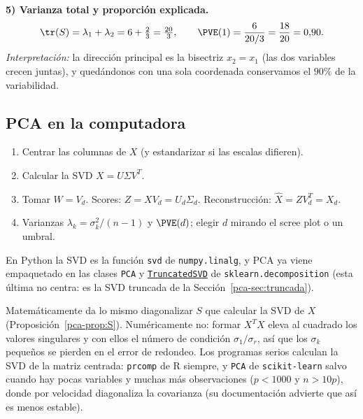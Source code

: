 \begin{example}
\medskip
\noindent\textbf{5) Varianza total y proporción explicada.}
\[
\tr(S)=\lambda_1+\lambda_2=6+\tfrac23=\tfrac{20}{3},\qquad
\PVE(1)=\frac{6}{20/3}=\frac{18}{20}=0{,}90 .
\]
\textit{Interpretación:} la dirección principal es la bisectriz $x_2=x_1$ (las
dos variables crecen juntas), y quedándonos con una sola coordenada
conservamos el $90\%$ de la variabilidad.
\end{example}

\subsection{PCA en la computadora}

\begin{enumerate}[leftmargin=*,itemsep=1pt]
\item Centrar las columnas de $X$ (y estandarizar si las escalas difieren).
\item Calcular la SVD $X=U\Sigma V^T$.
\item Tomar $W=V_d$. Scores: $Z=XV_d=U_d\Sigma_d$. Reconstrucción:
$\widehat X=ZV_d^T=X_d$.
\item Varianzas $\lambda_k=\sigma_k^2/(n-1)$ y $\PVE(d)$; elegir $d$ mirando el
scree plot o un umbral.
\end{enumerate}
En Python la SVD es la función \texttt{svd} de \texttt{numpy.linalg}, y PCA
ya viene empaquetado en las clases \texttt{PCA} y
\href{https://scikit-learn.org/stable/modules/generated/sklearn.decomposition.TruncatedSVD.html}{\texttt{TruncatedSVD}}
de \texttt{sklearn.decomposition} (esta última no centra: es la SVD truncada
de la Sección~\ref{pca-sec:truncada}).

\begin{remark}\label{pca-rem:numerica}
Matemáticamente da lo mismo diagonalizar $S$ que calcular la SVD de $X$
(Proposición~\ref{pca-prop:S}). Numéricamente no: formar $X^T X$ eleva al
cuadrado los valores singulares y con ellos el número de condición
$\sigma_1/\sigma_r$, así que los $\sigma_k$ pequeños se pierden en el error de
redondeo. Los programas serios calculan la SVD de la matriz centrada:
\texttt{prcomp} de R siempre, y \texttt{PCA} de \texttt{scikit-learn} salvo
cuando hay pocas variables y muchas más observaciones ($p<1000$ y $n>10p$),
donde por velocidad diagonaliza la covarianza (su documentación advierte que
así es menos estable).
\end{remark}

